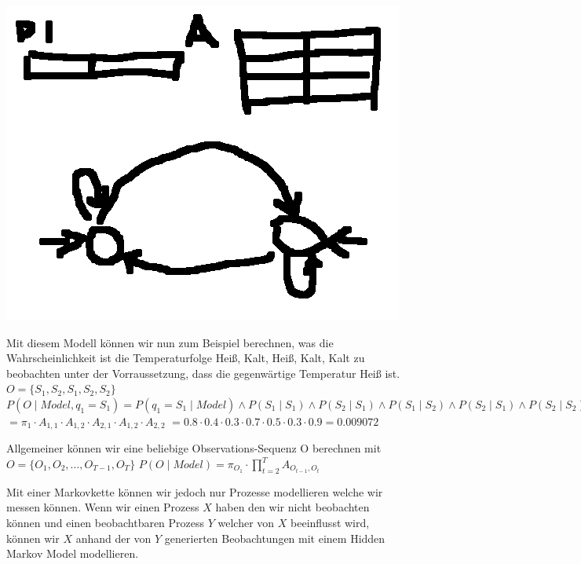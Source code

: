 \includegraphics[scale=1.0]{images/Markov_Chain_Example.png}

Mit diesem Modell können wir nun zum Beispiel berechnen, was die Wahrscheinlichkeit ist die Temperaturfolge 
{Heiß, Kalt, Heiß, Kalt, Kalt} zu beobachten unter der Vorraussetzung, dass die gegenwärtige Temperatur Heiß ist.
$O = \{S_1, S_2, S_1, S_2, S_2 \}$
$P(O \mid Model, q_1 = S_1) = P(q_1=S_1 \mid Model) 
\wedge P(S_1 \mid S_1) 
\wedge P(S_2 \mid S_1)
\wedge P(S_1 \mid S_2)
\wedge P(S_2 \mid S_1)
\wedge P(S_2 \mid S_2) $
$= \pi_{1} 
\cdot A_{1,1} 
\cdot A_{1,2} 
\cdot A_{2,1}
\cdot A_{1,2}
\cdot A_{2,2}$
$= 0.8 \cdot 0.4 \cdot 0.3 \cdot 0.7 \cdot 0.5 \cdot 0.3 \cdot 0.9 = 0.009072$

Allgemeiner können wir eine beliebige Observations-Sequenz O berechnen mit 
$O = \{O_1, O_2, \dots, O_{T-1}, O_T \}$
$P(O \mid Model) = \pi_{O_1} \cdot \prod_{t = 2}^{T} A_{O_{t-1}, O_t}$

Mit einer Markovkette können wir jedoch nur Prozesse modellieren welche wir messen können.
Wenn wir einen Prozess $X$ haben den wir nicht beobachten können und einen beobachtbaren Prozess $Y$ welcher von $X$ 
beeinflusst wird, können wir $X$ anhand der von $Y$ generierten Beobachtungen mit einem Hidden Markov Model modellieren.


